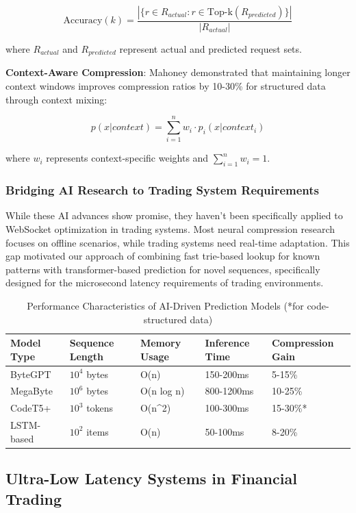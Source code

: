 \documentclass[12pt,a4paper]{article}
\begin{document}
$$\text{Accuracy}(k) = \frac{|\{r \in R_{actual} : r \in \text{Top-k}(R_{predicted})\}|}{|R_{actual}|}$$

where $R_{actual}$ and $R_{predicted}$ represent actual and predicted request sets.

\textbf{Context-Aware Compression}: Mahoney \cite{mahoney2005contextual} demonstrated that maintaining longer context windows improves compression ratios by 10-30\% for structured data through context mixing:

$$p(x|context) = \sum_{i=1}^{n} w_i \cdot p_i(x|context_i)$$

where $w_i$ represents context-specific weights and $\sum_{i=1}^{n} w_i = 1$.

\subsubsection{Bridging AI Research to Trading System Requirements}

While these AI advances show promise, they haven't been specifically applied to WebSocket optimization in trading systems. Most neural compression research focuses on offline scenarios, while trading systems need real-time adaptation. This gap motivated our approach of combining fast trie-based lookup for known patterns with transformer-based prediction for novel sequences, specifically designed for the microsecond latency requirements of trading environments.

\begin{table}[H]
\centering
\begin{tabular}{|l|l|l|l|l|}
\hline
\textbf{Model Type} & \textbf{Sequence Length} & \textbf{Memory Usage} & \textbf{Inference Time} & \textbf{Compression Gain} \\
\hline
ByteGPT & $10^4$ bytes & O(n) & 150-200ms & 5-15\% \\
MegaByte & $10^6$ bytes & O(n log n) & 800-1200ms & 10-25\% \\
CodeT5+ & $10^3$ tokens & O(n^2) & 100-300ms & 15-30\%* \\
LSTM-based & $10^2$ items & O(n) & 50-100ms & 8-20\% \\
\hline
\end{tabular}
\caption{Performance Characteristics of AI-Driven Prediction Models (*for code-structured data)}
\label{tab:ai-model-comparison}
\end{table}

\subsection{Ultra-Low Latency Systems in Financial Trading}
\end{document}
